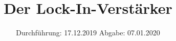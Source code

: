 

\subject{Versuchsnummer: 303}
\title{Der Lock-In-Verstärker}
\date{%
  Durchführung: 17.12.2019
  \hspace{3em}
  Abgabe: 07.01.2020
}



\maketitle
\thispagestyle{empty}
\tableofcontents
\newpage




\newpage
\nocite{*}
\printbibliography


